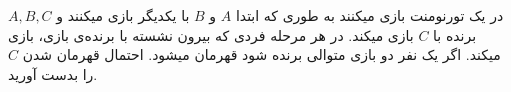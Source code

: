 $A, B, C$ در یک تورنومنت بازی میکنند به طوری که ابتدا $A$ و $B$ با یکدیگر بازی میکنند و برنده با $C$ بازی میکند.
در هر مرحله فردی که بیرون نشسته با برنده‌ی بازی، بازی میکند.
اگر یک نفر دو بازی متوالی برنده شود قهرمان میشود. احتمال قهرمان شدن $C$ را بدست آورید.
